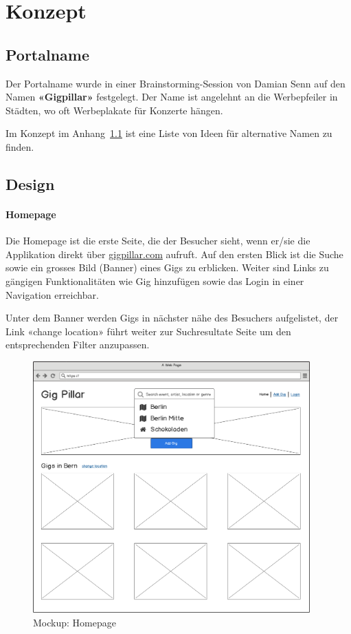 \chapter{Konzept}

\label{ReportKonzept}



\section{Portalname}\label{portalname}

Der Portalname wurde in einer Brainstorming-Session von Damian Senn auf
den Namen \textbf{«Gigpillar»} festgelegt. Der Name ist angelehnt an die Werbepfeiler in
Städten, wo oft Werbeplakate für Konzerte hängen.

Im Konzept im Anhang~\ref{portalname} ist eine Liste von Ideen für alternative Namen zu finden.

\clearpage
\section{Design}

\subsubsection{Homepage}

Die Homepage ist die erste Seite, die der Besucher sieht, wenn er/sie die
Applikation direkt über \href{https://gigpillar.com/}{gigpillar.com} aufruft.
Auf den ersten Blick ist die Suche sowie ein grosses Bild (Banner) eines Gigs
zu erblicken. Weiter sind Links zu gängigen Funktionalitäten wie Gig hinzufügen
sowie das Login in einer Navigation erreichbar.

Unter dem Banner werden Gigs in nächster nähe des Besuchers aufgelistet, der
Link «change location» führt weiter zur Suchresultate Seite um den
entsprechenden Filter anzupassen.

\begin{figure}[!htb]
  \centering
  \includegraphics[width=0.95\textwidth]{mockups/homepage.png}
  \caption{Mockup: Homepage}
\end{figure}

